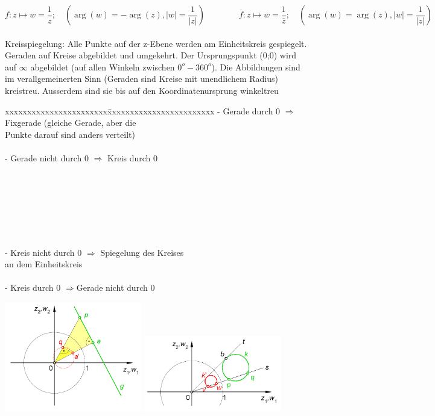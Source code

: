   $$ f : z \mapsto w = \frac{1}{z}; \quad (\arg(w) = -\arg(z), |w| = \frac{1}{|z|})
  \qquad \qquad 
  \overline{f}: z \mapsto w = \frac{1}{\overline{z}};  \quad  
  (\arg(w) = \arg(z), |w| = \frac{1}{|z|}) $$\\
  Kreisspiegelung: Alle Punkte auf der z-Ebene werden am Einheitskreis gespiegelt.
  Geraden auf Kreise abgebildet und umgekehrt. Der Ursprungspunkt (0;0) wird auf
  $ \infty $ abgebildet (auf allen Winkeln zwischen $0^o-360^o$). Die
  Abbildungen sind
  im verallgemeinerten Sinn (Geraden sind Kreise mit unendlichem Radius)
  kreistreu. Ausserdem sind sie bis auf den Koordinatenursprung winkeltreu\\
  \begin{minipage}{9cm}
    \begin{tabbing}
          xxxxxxxxxxxxxxxxxxxxxxx\=xxxxxxxxxxxxxxxxxxxxxxxx\kill
          - Gerade durch 0 $\Longrightarrow$ \>Fixgerade (gleiche Gerade, aber
          die \\ \>Punkte darauf sind anders verteilt)\\ \\
      - Gerade nicht durch 0 $\Longrightarrow$ Kreis durch 0\\ \\ \\ \\ \\ \\ \\ \\
      - Kreis nicht durch 0 $\Longrightarrow$ \>Spiegelung des Kreises\\ \> an dem
      Einheitskreis\\ \\
      - Kreis durch 0 $\Longrightarrow$\>Gerade nicht durch 0
        \end{tabbing}
  \end{minipage}
  \hspace{2cm}
  \begin{minipage}{6cm}
    \includegraphics[width=6cm]{./bilder/GeradeKreisspiegelung.png} 
      \includegraphics[width=6cm]{./bilder/KreisKreisspiegelung.png}
    \end{minipage}


